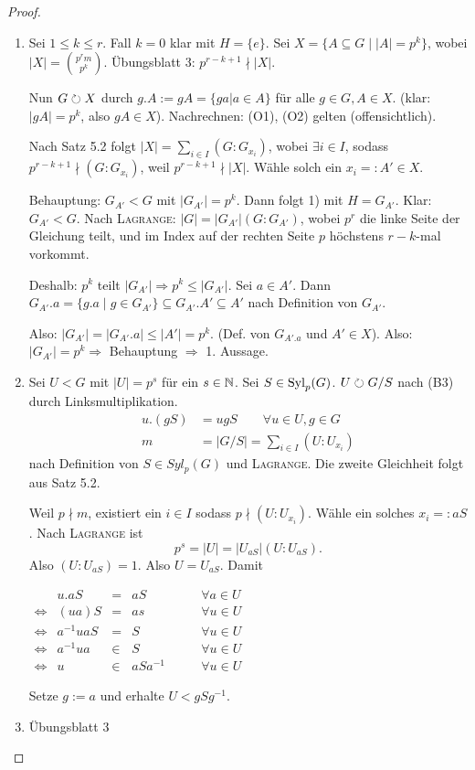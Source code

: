 \documentclass[12pt,a4paper]{scrartcl}
\begin{document}
\begin{proof}
	\leavevmode
	\begin{enumerate}
		\item Sei $1\leq k \leq r$. Fall $k = 0$ klar mit $H = \{e\}$. Sei $X = \{A\subseteq G \mid |A| = p^k\}$, wobei $|X| = \binom{p^rm}{p^k}$. Übungsblatt 3: $p^{r-k+1}\nmid |X|$.
		
		Nun $G \circlearrowright X$ durch $g.A := gA=\{ga|a\in A\}$ für alle $g\in G, A\in X$. (klar: $|gA| = p^k $, also $gA\in X$). Nachrechnen: (O1), (O2) gelten (offensichtlich). 
		
		Nach Satz 5.2 folgt $|X| = \sum_{i\in I}(G:G_{x_i})$, wobei $\exists i\in I$, sodass $p^{r-k+1} \nmid (G:G_{x_i})$, weil $p^{r-k+1}\nmid |X|$. Wähle solch ein $x_i = : A'\in X$.
		
		Behauptung: $G_{A'}<G$ mit $|G_{A'}| = p^k$. Dann folgt 1) mit $H = G_{A'}$. Klar: $G_{A'}<G$. Nach \textsc{Lagrange}: $|G| = |G_{A'}|(G:G_{A'})$, wobei $p^r$ die linke Seite der Gleichung teilt, und im Index auf der rechten Seite $p$ höchstens $r-k$-mal vorkommt.
		
		Deshalb: $p^k$ teilt $|G_{A'}|\Rightarrow p^k\leq |G_{A'}|$. Sei $a\in A'$. Dann $G_{A'}.a = \{g.a\mid g\in G_{A'}\}\subseteq G_{A'}.A'\subseteq A'$ nach Definition von $G_{A'}$.
		
		Also: $|G_{A'}| = |G_{A'}.a|\leq |A'| = p^k$.  (Def. von $G_{A'.a}$ und $A'\in X$).
		Also: $|G_{A'}| = p^k\Rightarrow$ Behauptung $\Rightarrow$ 1. Aussage.
		
		\item Sei $U<G$ mit $|U| = p^s$ für ein $s\in\mathbb N$. Sei $S\in \operatorname{Syl}_p(G)$. $U \circlearrowright G/S$ nach (B3) durch Linksmultiplikation.
		\begin{align*}
			u.(gS) &= ugS\qquad \forall u\in U, g\in G \\
			m &= |G/S| = \sum_{i\in I}(U:U_{x_i})
		\end{align*}
		nach Definition von $S\in Syl_p(G)$ und \textsc{Lagrange}. Die zweite Gleichheit folgt aus Satz 5.2.
		
		Weil $p\nmid m$, existiert ein $i\in I$ sodass $p\nmid (U:U_{x_i})$. Wähle ein solches $x_i =: aS$. Nach \textsc{Lagrange} ist
		\[ p^s = |U| = |U_{aS}|(U:U_{aS}).\] Also $(U:U_{aS}) = 1$. Also $U = U_{aS}$. Damit
		\begin{center}
			$ \begin{array}{crclc}
			&u.aS &=& aS      						\qquad& \forall a\in U\\
			\Leftrightarrow& (ua)S &=& as		\qquad &\forall u\in U\\
			\Leftrightarrow& a^{-1}uaS &=& S \qquad &\forall u\in U\\
			\Leftrightarrow& a^{-1}ua&\in& S  \qquad &\forall u\in U\\
			\Leftrightarrow& u&\in& aSa^{-1}  \qquad &\forall u\in U
			\end{array}$
		\end{center}
		Setze $g := a$ und erhalte $U<gSg^{-1}$.
		
		\item Übungsblatt 3
	\end{enumerate}
\end{proof}
\end{document}
